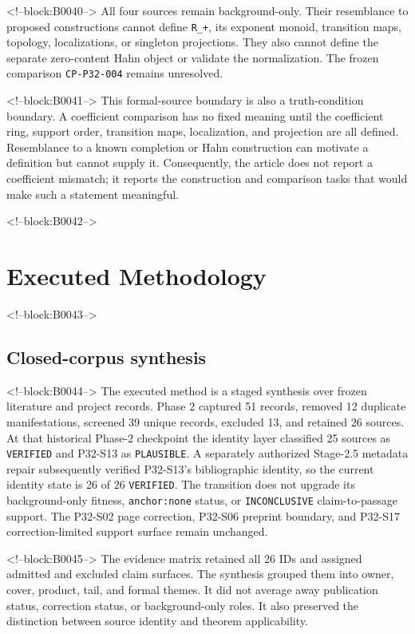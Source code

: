\documentclass[11pt]{article}
\begin{document}
<!--block:B0040-->
All four sources remain background-only. Their resemblance to proposed
constructions cannot define \texttt{R\_+}, its exponent monoid,
transition maps, topology, localizations, or singleton projections. They
also cannot define the separate zero-content Hahn object or validate the
normalization. The frozen comparison \texttt{CP-P32-004} remains
unresolved.

<!--block:B0041-->
This formal-source boundary is also a truth-condition boundary. A
coefficient comparison has no fixed meaning until the coefficient ring,
support order, transition maps, localization, and projection are all
defined. Resemblance to a known completion or Hahn construction can
motivate a definition but cannot supply it. Consequently, the article
does not report a coefficient mismatch; it reports the construction and
comparison tasks that would make such a statement meaningful.

<!--block:B0042-->
\hypertarget{3-executed-methodology}{%
\section{Executed Methodology}\label{3-executed-methodology}}

<!--block:B0043-->
\hypertarget{31-closed-corpus-synthesis}{%
\subsection{Closed-corpus
synthesis}\label{31-closed-corpus-synthesis}}

<!--block:B0044-->
The executed method is a staged synthesis over frozen literature and
project records. Phase 2 captured 51 records, removed 12 duplicate
manifestations, screened 39 unique records, excluded 13, and retained 26
sources. At that historical Phase-2 checkpoint the identity layer classified
25 sources as \texttt{VERIFIED} and P32-S13 as \texttt{PLAUSIBLE}. A separately
authorized Stage-2.5 metadata repair subsequently verified P32-S13's
bibliographic identity, so the current identity state is 26 of 26
\texttt{VERIFIED}. The transition does not upgrade its background-only fitness,
\texttt{anchor:none} status, or \texttt{INCONCLUSIVE} claim-to-passage support.
The P32-S02 page correction, P32-S06 preprint boundary, and P32-S17
correction-limited support surface remain unchanged.

<!--block:B0045-->
The evidence matrix retained all 26 IDs and assigned admitted and
excluded claim surfaces. The synthesis grouped them into owner, cover,
product, tail, and formal themes. It did not average away publication
status, correction status, or background-only roles. It also preserved
the distinction between source identity and theorem applicability.
\end{document}
